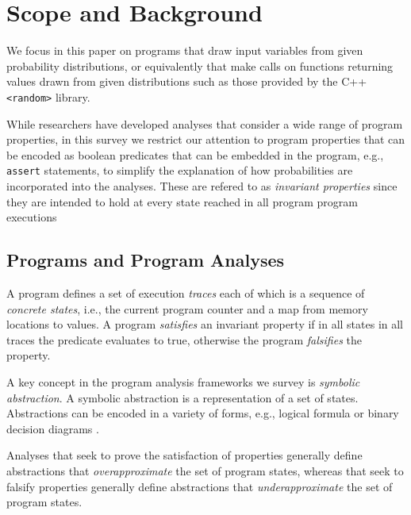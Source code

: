 \section{Scope and Background}
\label{sec:background}


We focus in this paper on programs that draw input variables
from given probability distributions, or equivalently that make
calls on functions returning values drawn from given distributions
such as those provided by the C++ \texttt{<random>} library.

While researchers have developed analyses that consider a wide
range of program properties, in this survey
we restrict our attention to program
properties that can be encoded as boolean predicates that
can be embedded in the program,
e.g., \texttt{assert} statements, to simplify the explanation
of how probabilities are incorporated into the analyses.
These are refered to as \textit{invariant properties} since
they are intended to hold at every state reached
in all program program executions

\subsection{Programs and Program Analyses}
A program defines a set of execution \textit{traces} each of
which is a sequence of \textit{concrete states}, i.e., 
the current program counter and a map from memory locations to values.
A program \textit{satisfies} an invariant property if in all states in
all traces the predicate evaluates to true, otherwise the program
\textit{falsifies} the property.

A key concept in the program analysis frameworks we survey is
\textit{symbolic abstraction}.  A symbolic abstraction is a 
representation of a set of states.  Abstractions can be encoded
in a variety of forms, e.g., logical formula or binary
decision diagrams \cite{BDD}.  

Analyses that seek to prove the satisfaction of properties generally
define abstractions that \textit{overapproximate} the set of program
states, whereas that seek to falsify properties generally define
abstractions that \textit{underapproximate} the set of program states.

